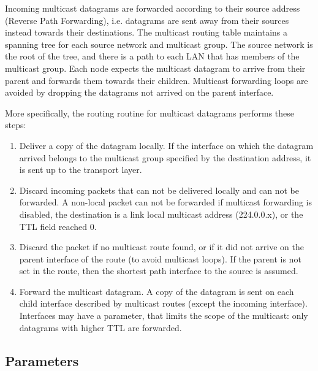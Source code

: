 Incoming multicast datagrams are forwarded according to their source address
(Reverse Path Forwarding), i.e. datagrams are sent away from their sources instead
towards their destinations. The multicast routing table maintains a spanning tree
for each source network and multicast group. The source network is the root of the
tree, and there is a path to each LAN that has members of the multicast group.
Each node expects the multicast datagram to arrive from their parent and forwards
them towards their children. Multicast forwarding loops are avoided by dropping the
datagrams not arrived on the parent interface.

More specifically, the routing routine for multicast datagrams performs these steps:
\begin{enumerate}
  \item Deliver a copy of the datagram locally. If the interface on which
  the datagram arrived belongs to the multicast group specified by the
  destination address, it is sent up to the transport layer.
  \item Discard incoming packets that can not be delivered locally and
  can not be forwarded.
  A non-local packet can not be forwarded if multicast forwarding is disabled,
  the destination is a link local multicast address (224.0.0.x), or
  the TTL field reached 0.
  \item Discard the packet if no multicast route found, or
  if it did not arrive on the parent interface of the route
  (to avoid multicast loops). If the parent is not set in the route,
  then the shortest path interface to the source is assumed.
  \item Forward the multicast datagram.
  A copy of the datagram is sent on each child interface described by
  multicast routes (except the incoming interface). Interfaces may have
  a  parameter, that limits the scope of the multicast:
  only datagrams with higher TTL are forwarded.
\end{enumerate}

\subsection{Parameters}

